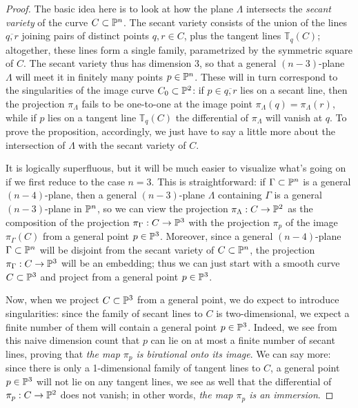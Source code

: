\begin{proof} The basic idea here is to look at how the plane $\Lambda$ intersects the \emph{secant variety} of the curve $C \subset {\mathbb P}^n$. The secant variety consists of the union of the lines $\overline{q,r}$ joining pairs of distinct points $q,r \in C$, plus the tangent lines ${\mathbb T}_q(C)$; altogether, these lines form a single family, parametrized by the symmetric square of $C$. The secant variety thus has dimension 3, so that a general $(n-3)$-plane $\Lambda$ will meet it in finitely many points $p \in {\mathbb P}^n$. These will in turn correspond to the singularities of the image curve $C_0 \subset {\mathbb P}^2$: if $p \in \overline{q,r}$ lies on a secant line, then the projection $\pi_\Lambda$ fails to be one-to-one at the image point $\pi_\Lambda(q) = \pi_\Lambda(r)$, while if $p$ lies on a tangent line ${\mathbb T}_q(C)$ the differential of $\pi_\Lambda$ will vanish at $q$. To prove the proposition, accordingly, we just have to say a little more about the intersection of $\Lambda$ with the secant variety of $C$. 


It is logically superfluous, but it will be much easier to visualize what's going on if we first reduce to the case $n=3$. This is straightforward: if $\Gamma \subset {\mathbb P}^n$ is a general $(n-4)$-plane, then a general $(n-3)$-plane $\Lambda$ containing $\Gamma$ is a general $(n-3)$-plane in ${\mathbb P}^n$, so we can view the projection $\pi_\Lambda : C \to {\mathbb P}^2$ as the composition of the projection $\pi_\Gamma : C \to {\mathbb P}^3$ with the projection $\pi_p$ of the image $\pi_\Gamma(C)$ from a general point $p \in {\mathbb P}^3$. Moreover, since a general  $(n-4)$-plane $\Gamma \subset {\mathbb P}^n$ will be disjoint from the secant variety of $C \subset {\mathbb P}^n$, the projection $\pi_\Gamma : C \to {\mathbb P}^3$ will be an embedding; thus we can just start with a smooth curve $C \subset {\mathbb P}^3$ and project from a general point $p \in {\mathbb P}^3$.


Now, when we project $C \subset {\mathbb P}^3$ from a general point, we do expect to introduce singularities: since the family of secant lines to $C$ is two-dimensional,  we expect a finite number of them will contain a general point $p \in {\mathbb P}^3$. Indeed, we see from this naive dimension count  that $p$ can lie on at most a finite number of secant lines, proving that \emph{the map $\pi_p$ is birational onto its image}. We can say more: since there is only a 1-dimensional family of tangent lines to $C$, a general point $p \in {\mathbb P}^3$ will not lie on any tangent lines, we see as well that the differential of $\pi_p : C \to {\mathbb P}^2$ does not vanish; in other words, \emph{the map $\pi_p$ is an immersion}.


\end{proof}
